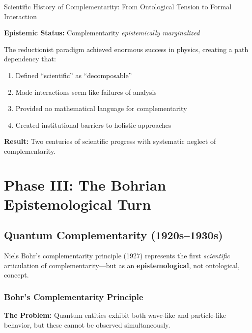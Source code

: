 \begin{chapter}{Scientific History of Complementarity: From Ontological Tension to Formal Interaction}
\begin{tcolorbox}[colback=red!5!white,colframe=red!75!black,title=\textbf{Phase II Verdict}]
\textbf{Epistemic Status:} Complementarity \textit{epistemically marginalized}

The reductionist paradigm achieved enormous success in physics, creating a path dependency that:
\begin{enumerate}[noitemsep]
    \item Defined ``scientific'' as ``decomposable''
    \item Made interactions seem like failures of analysis
    \item Provided no mathematical language for complementarity
    \item Created institutional barriers to holistic approaches
\end{enumerate}

\textbf{Result:} Two centuries of scientific progress with systematic neglect of complementarity.
\end{tcolorbox}

\section{Phase III: The Bohrian Epistemological Turn}
\label{sec:phase-iii}

\subsection{Quantum Complementarity (1920s--1930s)}

\begin{tcolorbox}[colback=green!5!white,colframe=green!75!black,title=\textbf{Historical Turning Point}]
Niels Bohr's complementarity principle (1927) represents the first \textit{scientific} articulation of complementarity---but as an \textbf{epistemological}, not ontological, concept.
\end{tcolorbox}

\subsubsection{Bohr's Complementarity Principle}

\textbf{The Problem:} Quantum entities exhibit both wave-like and particle-like behavior, but these cannot be observed simultaneously.


\end{chapter}
